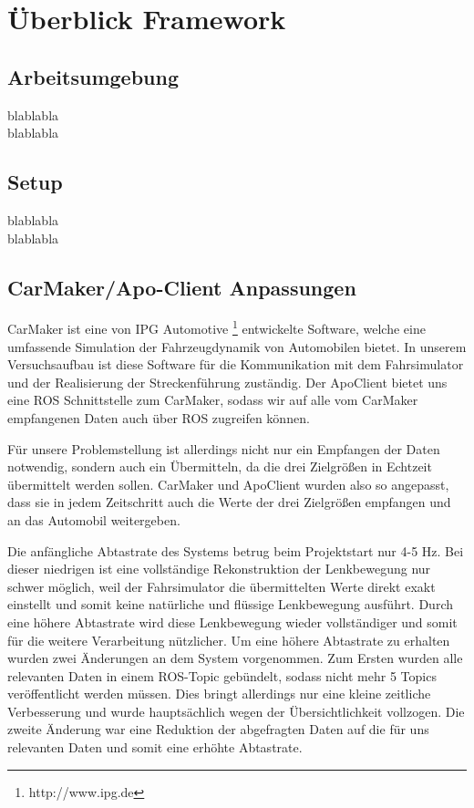 
\chapter{Überblick Framework} %
\label{cha:Ueberblick_Framework}


\section{Arbeitsumgebung} %
\label{sub:Arbeitsumgebung}
blablabla\\

blablabla


\section{Setup} %
\label{sub:Setup}
blablabla\\

blablabla


\section{CarMaker/Apo-Client Anpassungen} %
\label{sub:Carmaker_Apo_Client_Anpassungen}
CarMaker ist eine von IPG Automotive \footnote{http://www.ipg.de} entwickelte Software, welche eine umfassende Simulation der Fahrzeugdynamik von Automobilen bietet. In unserem Versuchsaufbau ist diese Software für die Kommunikation mit dem Fahrsimulator und der Realisierung der Streckenführung zuständig.
Der ApoClient bietet uns eine ROS Schnittstelle zum CarMaker, sodass wir auf alle vom CarMaker empfangenen Daten auch über ROS zugreifen können.

Für unsere Problemstellung ist allerdings nicht nur ein Empfangen der Daten notwendig, sondern auch ein Übermitteln, da die drei Zielgrößen in Echtzeit übermittelt werden sollen. CarMaker und ApoClient wurden also so angepasst, dass sie in jedem Zeitschritt auch die Werte der drei Zielgrößen empfangen und an das Automobil weitergeben.

Die anfängliche Abtastrate des Systems betrug beim Projektstart nur 4-5 Hz. Bei dieser niedrigen ist eine vollständige Rekonstruktion der Lenkbewegung nur schwer möglich, weil der Fahrsimulator die übermittelten Werte direkt exakt einstellt und somit keine natürliche und flüssige Lenkbewegung ausführt. Durch eine höhere Abtastrate wird diese Lenkbewegung wieder vollständiger und somit für die weitere Verarbeitung nützlicher.
Um eine höhere Abtastrate zu erhalten wurden zwei Änderungen an dem System vorgenommen. Zum Ersten wurden alle relevanten Daten in einem ROS-Topic gebündelt, sodass nicht mehr 5 Topics veröffentlicht werden müssen. Dies bringt allerdings nur eine kleine zeitliche Verbesserung und wurde hauptsächlich wegen der Übersichtlichkeit vollzogen. Die zweite Änderung war eine Reduktion der abgefragten Daten auf die für uns relevanten Daten und somit eine erhöhte Abtastrate.


